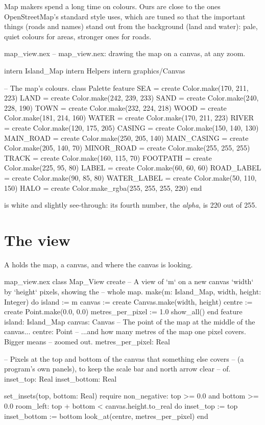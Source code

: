 Map makers spend a long time on colours. Ours are close to the ones
OpenStreetMap's standard style uses, which are tuned so that the important
things (roads and names) stand out from the background (land and water):
pale, quiet colours for areas, stronger ones for roads.

\begin{newfile}{map_view.nex}
-- map_view.nex: drawing the map on a canvas, at any zoom.

intern Island_Map
intern Helpers
intern graphics/Canvas

-- The map's colours.
class Palette
feature
  SEA = create Color.make(170, 211, 223)
  LAND = create Color.make(242, 239, 233)
  SAND = create Color.make(240, 228, 190)
  TOWN = create Color.make(232, 224, 218)
  WOOD = create Color.make(181, 214, 160)
  WATER = create Color.make(170, 211, 223)
  RIVER = create Color.make(120, 175, 205)
  CASING = create Color.make(150, 140, 130)
  MAIN_ROAD = create Color.make(250, 205, 140)
  MAIN_CASING = create Color.make(205, 140, 70)
  MINOR_ROAD = create Color.make(255, 255, 255)
  TRACK = create Color.make(160, 115, 70)
  FOOTPATH = create Color.make(225, 95, 80)
  LABEL = create Color.make(60, 60, 60)
  ROAD_LABEL = create Color.make(90, 85, 80)
  WATER_LABEL = create Color.make(50, 110, 150)
  HALO = create Color.make_rgba(255, 255, 255, 220)
end
\end{newfile}

 is white and slightly see-through: its fourth number, the
\emph{alpha}, is 220 out of 255.

\section{The view}

A  holds the map, a canvas, and where the canvas is looking.

\begin{append}{map_view.nex}
class Map_View
create
  -- A view of `m` on a new canvas `width` by `height` pixels, showing the
  -- whole map.
  make(m: Island_Map, width, height: Integer) do
    island := m
    canvas := create Canvas.make(width, height)
    centre := create Point.make(0.0, 0.0)
    metres_per_pixel := 1.0
    show_all()
  end
feature
  island: Island_Map
  canvas: Canvas
  -- The point of the map at the middle of the canvas...
  centre: Point
  -- ...and how many metres of the map one pixel covers. Bigger means
  -- zoomed out.
  metres_per_pixel: Real

  -- Pixels at the top and bottom of the canvas that something else covers
  -- (a program's own panels), to keep the scale bar and north arrow clear
  -- of.
  inset_top: Real
  inset_bottom: Real

  set_insets(top, bottom: Real)
  require
    non_negative: top >= 0.0 and bottom >= 0.0
    room_left: top + bottom < canvas.height.to_real
  do
    inset_top := top
    inset_bottom := bottom
    look_at(centre, metres_per_pixel)
  end
\end{append}

